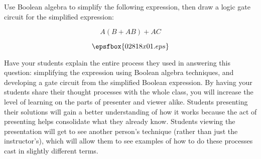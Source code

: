 

Use Boolean algebra to simplify the following expression, then draw a logic gate circuit for the simplified expression:

$$A(B + AB) + AC$$







$$\epsfbox{02818x01.eps}$$







Have your students explain the entire process they used in answering this question: simplifying the expression using Boolean algebra techniques, and developing a gate circuit from the simplified Boolean expression.  By having your students share their thought processes with the whole class, you will increase the level of learning on the parts of presenter and viewer alike.  Students presenting their solutions will gain a better understanding of how it works because the act of presenting helps consolidate what they already know.  Students viewing the presentation will get to see another person's technique (rather than just the instructor's), which will allow them to see examples of how to do these processes cast in slightly different terms.





